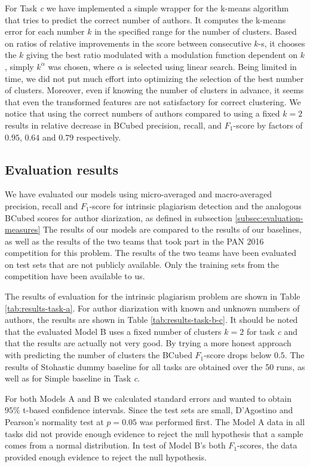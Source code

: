 \documentclass[10pt, a4paper]{article}
\begin{document}
For Task \emph{c} we have implemented a simple wrapper for the k-means algorithm that tries to predict the correct number of authors. It computes the k-means error for each number $k$ in the specified range for the number of clusters. Based on ratios of relative improvements in the score between consecutive $k$-s, it chooses the $k$ giving the best ratio modulated with a modulation function dependent on $k$, simply $k^\alpha$ was chosen, where $\alpha$ is selected using linear search. Being limited in time, we did not put much effort into optimizing the selection of the best number of clusters. Moreover, even if knowing the number of clusters in advance, it seems that even the transformed features are not satisfactory for correct clustering. We notice that using the correct numbers of authors compared to using a fixed $k=2$ results in relative decrease in BCubed precision, recall, and $F_1$-score by factors of $0.95$, $0.64$ and $0.79$ respectively.

\subsection{Evaluation results}

We have evaluated our models using micro-averaged and macro-averaged precision, recall and $F_1$-score for intrinsic plagiarism detection and the analogous BCubed scores for author diarization, as defined in subsection \ref{subsec:evaluation-measures} The results of our models are compared to the results of our baselines, as well as the results of the two teams that took part in the PAN 2016 competition for this problem. The results of the two teams have been evaluated on test sets that are not publicly available. Only the training sets from the competition have been available to us.

The results of evaluation for the intrinsic plagiarism problem are shown in Table \ref{tab:results-task-a}. For author diarization with known and unknown numbers of authors, the results are shown in Table \ref{tab:results-task-b-c}. It should be noted that the evaluated Model B uses a fixed number of clusters $k=2$ for task \emph{c} and that the results are actually not very good. By trying a more honest approach with predicting the number of clusters the BCubed $F_1$-score drops below $0.5$. The results of Stohastic dummy baseline for all tasks are obtained over the 50 runs, as well as for Simple baseline in Task \emph{c}.

For both Models A and B we calculated standard errors and wanted to obtain $95\%$ t-based confidence intervals. Since the test sets are small, D’Agostino and Pearson’s normality test at $p=0.05$ was performed first. The Model A data in all tasks did not provide enough evidence to reject the null hypothesis that a sample comes from a normal distribution. In test of Model B's both $F_1$-scores, the data provided enough evidence to reject the null hypothesis.
\end{document}

